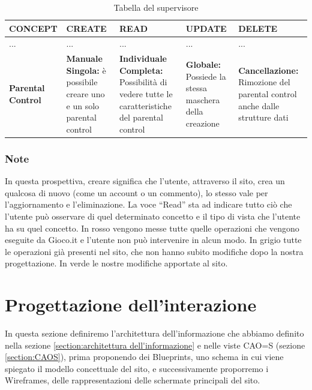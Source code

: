 \documentclass[../Report.tex]{subfiles}
\begin{document}
    \begin{table}[H]
        \hspace{-2.5cm}
        \begin{tabular}{|p{2.5cm}|p{3.5cm}|p{3.5cm}|p{3.5cm}|p{3.5cm}|}
            \hline
            \textbf{CONCEPT} & \textbf{CREATE} & \textbf{READ} & \textbf{UPDATE} & \textbf{DELETE} \\
            \hline
            ... & ... & ... & ... & ... \\
            \hline
            \textbf{Parental Control} & \cellcolor{green} \textbf{Manuale Singola:} è possibile creare uno e un solo parental control & \cellcolor{green} \textbf{Individuale Completa:} Possibilità di vedere tutte le caratteristiche del parental control & \cellcolor{green} \textbf{Globale:} Possiede la stessa maschera della creazione & \cellcolor{green} \textbf{Cancellazione:} Rimozione del parental control anche dalle strutture dati \\
            \hline
        \end{tabular}
        \caption{\label{tab:supervisore}Tabella del supervisore}
    \end{table}
    
    \subsubsection{Note}
    In questa prospettiva, creare significa che l’utente, attraverso il sito, crea un qualcosa di nuovo (come un account o un commento), lo stesso vale per l’aggiornamento e l’eliminazione. La voce “Read” sta ad indicare tutto ciò che l’utente può osservare di quel determinato concetto e il tipo di vista che l'utente ha su quel concetto. In rosso vengono messe tutte quelle operazioni che vengono eseguite da Gioco.it e l’utente non può intervenire in alcun modo. In grigio tutte le operazioni già presenti nel sito, che non hanno subito modifiche dopo la nostra progettazione. In verde le nostre modifiche apportate al sito.

    \section{Progettazione dell'interazione}
    In questa sezione definiremo l'architettura dell'informazione che abbiamo definito nella sezione \ref{section:architettura dell'informazione} e nelle viste CAO=S (sezione \ref{section:CAOS}), prima proponendo dei Blueprints, uno schema in cui viene spiegato il modello concettuale del sito, e successivamente proporremo i Wireframes, delle rappresentazioni delle schermate principali del sito.
\end{document}
